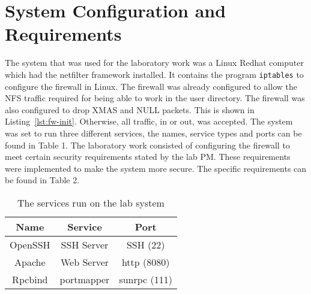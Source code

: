 \section{System Configuration and Requirements}
\label{sec:setup}
The system that was used for the laboratory work was a Linux Redhat computer which had the netfilter framework installed. It contains the program \verb;iptables; to configure the firewall in Linux. The firewall was already configured to allow the NFS traffic required for being able to work in the user directory. The firewall was also configured to drop XMAS and NULL packets. This is shown in Listing~\ref{lst:fw-init}. Otherwise, all traffic, in or out, was accepted. The system was set to run three different services, the names, service types and ports can be found in Table 1. The laboratory work consisted of configuring the firewall to meet certain security requirements stated by the lab PM. These requirements were implemented to make the system more secure. The specific requirements can be found in Table 2.


\begin{table}[htp]
\centering
	\begin{tabular}{| c | c | c |}
	\hline
	 Name & Service & Port \\ \hline
	 OpenSSH & SSH Server & SSH (22) \\
	 Apache & Web Server & http (8080) \\
	 Rpcbind & portmapper & sunrpc (111) \\ 
	\hline
	\end{tabular}
	\caption{The services run on the lab system}
	\label{Service table}
\end{table}


